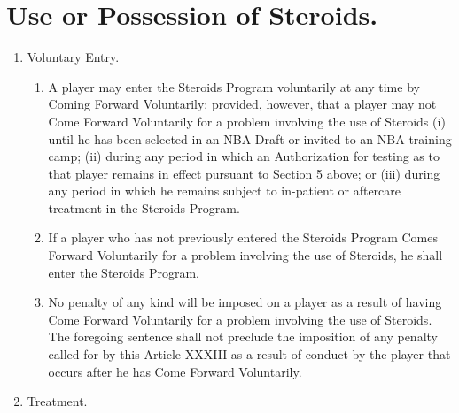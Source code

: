 \documentclass[
]{book}
\providecommand{\tightlist}{%
  \setlength{\itemsep}{0pt}\setlength{\parskip}{0pt}}
\begin{document}
\hypertarget{use-or-possession-of-steroids.}{%
\section{Use or Possession of Steroids.}\label{use-or-possession-of-steroids.}}

\begin{enumerate}
\def\labelenumi{(\alph{enumi})}
\item
  Voluntary Entry.

  \begin{enumerate}
  \def\labelenumii{(\roman{enumii})}
  \tightlist
  \item
    A player may enter the Steroids Program voluntarily at any time by Coming Forward Voluntarily; provided, however, that a player may not Come Forward Voluntarily for a problem involving the use of Steroids (i) until he has been selected in an NBA Draft or invited to an NBA training camp; (ii) during any period in which an Authorization for testing as to that player remains in effect pursuant to Section 5 above; or (iii) during any period in which he remains subject to in-patient or aftercare treatment in the Steroids Program.
  \item
    If a player who has not previously entered the Steroids Program Comes Forward Voluntarily for a problem involving the use of Steroids, he shall enter the Steroids Program.
  \item
    No penalty of any kind will be imposed on a player as a result of having Come Forward Voluntarily for a problem involving the use of Steroids. The foregoing sentence shall not preclude the imposition of any penalty called for by this Article XXXIII as a result of conduct by the player that occurs after he has Come Forward Voluntarily.
  \end{enumerate}
\item
  Treatment.


\end{enumerate}
\end{document}
